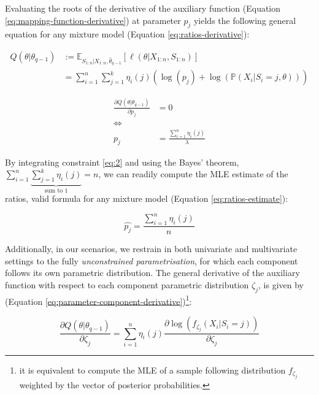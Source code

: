 Evaluating the roots of the derivative of the auxiliary function
(Equation \eqref{eq:mapping-function-derivative}) at parameter \(p_j\) yields the following general
equation for any mixture model (Equation \eqref{eq:ratios-derivative}):

\begin{equation}
\begin{split}
Q(\theta|\theta_{q-1}) & := \mathbb{E}_{S_{1:n}| X_{1:n}, \hat{\theta}_{q-1}} \left[\ell(\theta | X_{1:n}, S_{1:n})\right] \\
&=\sum_{i=1}^n \sum_{j=1}^k \eta_{i}(j) \left( \log (p_j) +  \log (\mathbb{P}(X_i|S_i=j, \theta)) \right)
\end{split}
\label{eq:8}
\end{equation}

\begin{equation}
\begin{split}
\frac{\partial Q(\theta|\theta_{q-1})}{\partial p_j} &=0 \\
 \Longleftrightarrow &\\
p_j&=\frac{\sum_{i=1}^n \eta_{i}(j)}{\lambda}
\end{split}
\label{eq:ratios-derivative}
\end{equation}

By integrating constraint \eqref{eq:2} and using the Bayes' theorem,
\(\sum_{i=1}^n \underbrace{\sum_{j=1}^k \eta_i(j)}_{\text{sum to 1}}=n\), we can readily compute the MLE estimate of the
ratios, valid formula for any mixture model (Equation \eqref{eq:ratios-estimate}):

\begin{equation}
\hat{p_j}= \frac{\sum_{i=1}^n \eta_{i}(j)}{n}
\label{eq:ratios-estimate}
\end{equation}

Additionally, in our scenarios, we restrain in both univariate and
multivariate settings to the fully \emph{unconstrained parametrisation}, for which each
component follows its own parametric distribution. The general
derivative of the auxiliary function with respect to each
component parametric distribution \(\zeta_j\), is given by (Equation
\eqref{eq:parameter-component-derivative})\footnote{ it is equivalent to compute the MLE of a sample following distribution \(f_{\zeta_j}\) weighted by the vector of posterior probabilities.}:

\begin{equation}
\frac{\partial Q(\theta|\theta_{q-1})}{\partial \zeta_j}=\sum_{i=1}^n  \eta_{i}(j) \frac{\partial \log (f_{\zeta_j}(X_i|S_i=j))}{\partial \zeta_j}
\label{eq:parameter-component-derivative}
\end{equation}

